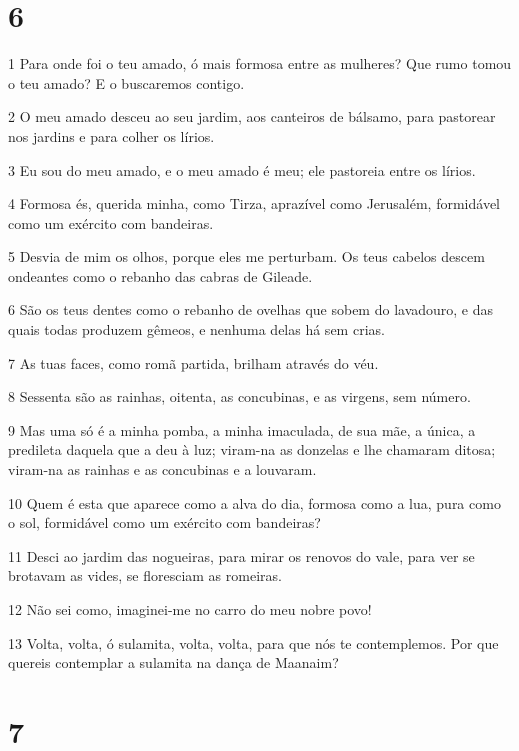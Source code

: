 \chapter{6}

\par 1 Para onde foi o teu amado, ó mais formosa entre as mulheres? Que rumo tomou o teu amado? E o buscaremos contigo.
\par 2 O meu amado desceu ao seu jardim, aos canteiros de bálsamo, para pastorear nos jardins e para colher os lírios.
\par 3 Eu sou do meu amado, e o meu amado é meu; ele pastoreia entre os lírios.
\par 4 Formosa és, querida minha, como Tirza, aprazível como Jerusalém, formidável como um exército com bandeiras.
\par 5 Desvia de mim os olhos, porque eles me perturbam. Os teus cabelos descem ondeantes como o rebanho das cabras de Gileade.
\par 6 São os teus dentes como o rebanho de ovelhas que sobem do lavadouro, e das quais todas produzem gêmeos, e nenhuma delas há sem crias.
\par 7 As tuas faces, como romã partida, brilham através do véu.
\par 8 Sessenta são as rainhas, oitenta, as concubinas, e as virgens, sem número.
\par 9 Mas uma só é a minha pomba, a minha imaculada, de sua mãe, a única, a predileta daquela que a deu à luz; viram-na as donzelas e lhe chamaram ditosa; viram-na as rainhas e as concubinas e a louvaram.
\par 10 Quem é esta que aparece como a alva do dia, formosa como a lua, pura como o sol, formidável como um exército com bandeiras?
\par 11 Desci ao jardim das nogueiras, para mirar os renovos do vale, para ver se brotavam as vides, se floresciam as romeiras.
\par 12 Não sei como, imaginei-me no carro do meu nobre povo!
\par 13 Volta, volta, ó sulamita, volta, volta, para que nós te contemplemos. Por que quereis contemplar a sulamita na dança de Maanaim?

\chapter{7}

